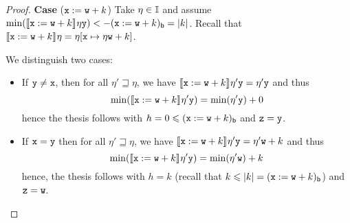 \begin{proof}
  
  \medskip
  
  \noindent
  \textbf{Case} (\(\var := \var[w] + k\))
  Take \(\eta \in \inte\) and assume
  \(\min(\semi{\var := \var[w] + k}\eta \var[y]) < -\lbound{\var :=
    \var[w] + k} = |k|\).
  Recall that
  \(\semi{\var := \var[w] + k}\eta = \eta[\var \mapsto \eta \var[w] + k]\).
  
  We distinguish two cases:
  \begin{itemize}
    
  \item If \(\var[y] \neq \var\), then for all \(\eta' \sqsupseteq \eta\), we have
    \(\semi{\var := \var[w] + k}\eta' \var[y] = \eta' \var[y]\) and thus
    \begin{equation*}
      \min(\semi{\var := \var[w] + k}\eta' \var[y]) = \min(\eta' \var[y]) + 0
    \end{equation*}
    hence the thesis follows with
    \(h =0 \leq \lbound{\var := \var[w] + k}\) and \(\var[z] = \var[y]\).
    
  \item 
    If \(\var = \var[y]\) then  for all \(\eta' \sqsupseteq \eta\), we have
    \(\semi{\var := \var[w] + k}\eta' \var[y] = \eta' \var[w] +
    k\) and thus
    \begin{equation*}
      \min(\semi{\var := \var[w] + k}\eta' \var[y]) = \min(\eta' \var[w]) +
      k
    \end{equation*}
    hence, the thesis follows with \(h = k\) (recall that
    \(k \leq |k| = \lbound{\var := \var[w] + k}\)) and
    \(\var[z] = \var[w]\).
  \end{itemize}

  
  
  
    
    

\end{proof}
